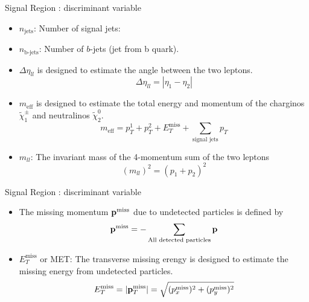 \documentclass[mathserif,serif]{beamer}
\begin{document}
\begin{frame}{Signal Region : discriminant variable}
\begin{itemize}
\item $n_{\text{jets}}$: Number of signal jets:
\item $n_{\text{b-jets}}$: Number of $b$-jets (jet from b quark).
\item $\Delta \eta_{ll}$ is designed to estimate the angle between the two leptons.
\begin{equation*}
\Delta \eta_{ll} = |\eta_{1} - \eta_{2}|
\end{equation*}
\item $m_{\text{eff}}$ is designed to estimate the total energy and momentum of the charginos $\tilde{\chi}_1^\pm$ and neutralinos $\tilde{\chi}_2^0$.
\begin{equation*}
m_{\text{eff}} = p_T^1 + p_T^2 + E_T^{\text{miss}} + \sum_{\text {signal jets}} p_T
\end{equation*}
\item $m_{ll}$: The invariant mass of the 4-momentum sum of the two leptons
\begin{equation*}
(m_{ll})^2 = (p_1 + p_2)^2
\end{equation*}
\end{itemize}
\end{frame}

\begin{frame}{Signal Region : discriminant variable}
\begin{itemize}
\item The missing momentum ${\bf p}^{\text{miss}}$ due to undetected particles is defined by
\begin{equation*}
{\bf p}^{\text{miss}} = - \sum_{\text{All detected particles}}{\bf p}
\end{equation*}
\item $E_{T}^{\text{miss}}$ or MET: The transverse missing erengy is designed to estimate the missing energy from undetected particles.
\begin{equation*}
E_{T}^{\text{miss}} = |{\bf p}_T^{\text{miss}}| = \sqrt{ (p_x^{\text{miss}})^2 + (p_y^{\text{miss}})^2}
\end{equation*}
\end{itemize}
\end{frame}
\end{document}
